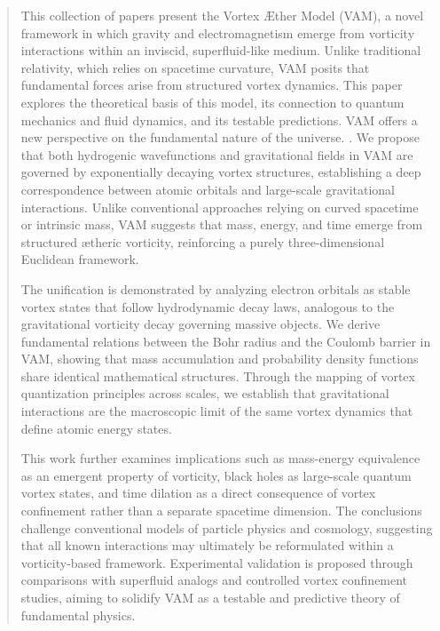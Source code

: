 \documentclass[a4paper,10pt]{article}
\begin{document}
    \begin{abstract}
         This collection of papers present the Vortex Æther Model (VAM), a novel framework in which gravity and electromagnetism emerge from vorticity interactions within an inviscid, superfluid-like medium. Unlike traditional relativity, which relies on spacetime curvature, VAM posits that fundamental forces arise from structured vortex dynamics. This paper explores the theoretical basis of this model, its connection to quantum mechanics and fluid dynamics, and its testable predictions. VAM offers a new perspective on the fundamental nature of the universe. . We propose that both hydrogenic wavefunctions and gravitational fields in VAM are governed by exponentially decaying vortex structures, establishing a deep correspondence between atomic orbitals and large-scale gravitational interactions. Unlike conventional approaches relying on curved spacetime or intrinsic mass, VAM suggests that mass, energy, and time emerge from structured ætheric vorticity, reinforcing a purely three-dimensional Euclidean framework.

        The unification is demonstrated by analyzing electron orbitals as stable vortex states that follow hydrodynamic decay laws, analogous to the gravitational vorticity decay governing massive objects. We derive fundamental relations between the Bohr radius and the Coulomb barrier in VAM, showing that mass accumulation and probability density functions share identical mathematical structures. Through the mapping of vortex quantization principles across scales, we establish that gravitational interactions are the macroscopic limit of the same vortex dynamics that define atomic energy states.

        This work further examines implications such as mass-energy equivalence as an emergent property of vorticity, black holes as large-scale quantum vortex states, and time dilation as a direct consequence of vortex confinement rather than a separate spacetime dimension. The conclusions challenge conventional models of particle physics and cosmology, suggesting that all known interactions may ultimately be reformulated within a vorticity-based framework. Experimental validation is proposed through comparisons with superfluid analogs and controlled vortex confinement studies, aiming to solidify VAM as a testable and predictive theory of fundamental physics.
    \end{abstract}


   \newpage \tableofcontents
\end{document}
